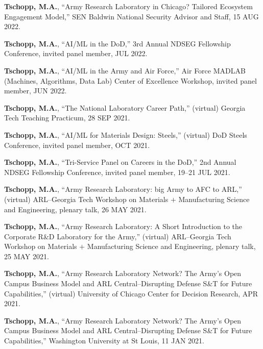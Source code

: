 \begin{cvlist}
\item
\textbf{Tschopp, M.A.}, ``Army Research Laboratory in Chicago? Tailored Ecosystem Engagement Model,'' SEN Baldwin National Security Advisor and Staff, 15 AUG 2022.

\item
\textbf{Tschopp, M.A.}, ``AI/ML in the DoD,'' 3rd Annual NDSEG Fellowship Conference, invited panel member, JUL 2022.

\item
\textbf{Tschopp, M.A.}, ``AI/ML in the Army and Air Force,'' Air Force MADLAB (Machines, Algorithms, Data Lab) Center of Excellence Workshop, invited panel member, JUN 2022.

\item
\textbf{Tschopp, M.A.}, ``The National Laboratory Career Path,'' (virtual) Georgia Tech Teaching Practicum, 28 SEP 2021.

\item
\textbf{Tschopp, M.A.}, ``AI/ML for Materials Design: Steels,'' (virtual) DoD Steels Conference, invited panel member, OCT 2021.

\item
\textbf{Tschopp, M.A.}, ``Tri-Service Panel on Careers in the DoD,'' 2nd Annual NDSEG Fellowship Conference, invited panel member, 19--21 JUL 2021.

\item
\textbf{Tschopp, M.A.}, ``Army Research Laboratory: big Army to AFC to ARL,'' (virtual) ARL--Georgia Tech Workshop on Materials $+$ Manufacturing Science and Engineering, plenary talk, 26 MAY 2021.

\item
\textbf{Tschopp, M.A.}, ``Army Research Laboratory: A Short Introduction to the Corporate R\&D Laboratory for the Army,'' (virtual) ARL--Georgia Tech Workshop on Materials $+$ Manufacturing Science and Engineering, plenary talk, 25 MAY 2021.

\item
\textbf{Tschopp, M.A.}, ``Army Research Laboratory Network? The Army's Open Campus Business Model and ARL Central--Disrupting Defense S\&T for Future Capabilities,'' (virtual) University of Chicago Center for Decision Research, APR 2021.

\item
\textbf{Tschopp, M.A.}, ``Army Research Laboratory Network? The Army's Open Campus Business Model and ARL Central--Disrupting Defense S\&T for Future Capabilities,'' Washington University at St Louis, 11 JAN 2021.


\end{cvlist}
